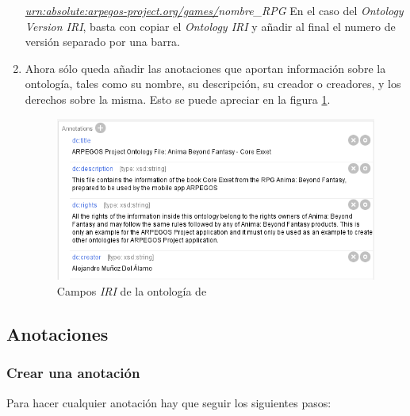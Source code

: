 \begin{enumerate}
    \textit{\underline{urn:absolute:arpegos-project.org/games/}nombre\_RPG} \medskip
    \newpage
    En el caso del \textit{Ontology Version IRI}, basta con copiar el \textit{Ontology IRI} y añadir al final el numero de versión 
    separado por una barra.\medskip

    \item Ahora sólo queda añadir las anotaciones que aportan información sobre la ontología, tales como su nombre, su descripción, su
    creador o creadores, y los derechos sobre la misma. Esto se puede apreciar en la figura \ref*{anima_annotations}.

    \begin{figure}[ht]
        \centering
        \includegraphics[scale=0.6]{Figures/Protege/anima_annotations.png}
        \caption{Campos \textit{IRI} de la ontología de \anima}
        \label{anima_annotations}
    \end{figure}
\end{enumerate}

\subsection{Anotaciones}
\subsubsection{Crear una anotación}
Para hacer cualquier anotación hay que seguir los siguientes pasos:

